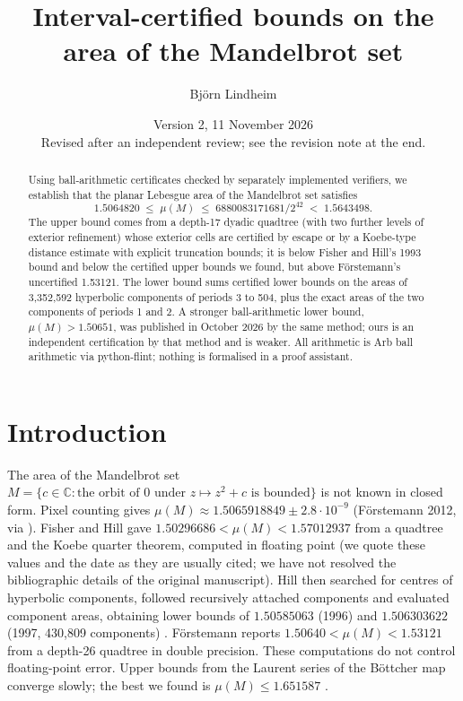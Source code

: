 \documentclass[11pt]{article}
\title{Interval-certified bounds on the area of the Mandelbrot set}
\author{Bj\"orn Lindheim}
\date{Version 2, 11 November 2026 \\[0.5ex] \small Revised after an independent review; see the revision note at the end.}
\begin{document}
\maketitle

\begin{abstract}
Using ball-arithmetic certificates checked by separately implemented verifiers, we establish that the planar Lebesgue area of the Mandelbrot set satisfies
\[
  1.5064820 \;\le\; \mu(M) \;\le\; 6880083171681/2^{42} \;<\; 1.5643498 .
\]
The upper bound comes from a depth-17 dyadic quadtree (with two further levels of exterior refinement) whose exterior cells are certified by escape or by a Koebe-type distance estimate with explicit truncation bounds; it is below Fisher and Hill's 1993 bound and below the certified upper bounds we found, but above F\"orstemann's uncertified 1.53121. The lower bound sums certified lower bounds on the areas of 3,352,592 hyperbolic components of periods 3 to 504, plus the exact areas of the two components of periods 1 and 2. A stronger ball-arithmetic lower bound, $\mu(M)>1.50651$, was published in October 2026 by the same method; ours is an independent certification by that method and is weaker. All arithmetic is Arb ball arithmetic via python-flint; nothing is formalised in a proof assistant.
\end{abstract}

\section{Introduction}

The area of the Mandelbrot set $M=\{c\in\mathbb{C}: \text{the orbit of }0\text{ under }z\mapsto z^2+c\text{ is bounded}\}$ is not known in closed form. Pixel counting gives $\mu(M)\approx1.5065918849\pm2.8\cdot10^{-9}$ (F\"orstemann 2012, via \cite{munafo}). Fisher and Hill \cite{fisherhill1993} gave $1.50296686<\mu(M)<1.57012937$ from a quadtree and the Koebe quarter theorem, computed in floating point (we quote these values and the date as they are usually cited; we have not resolved the bibliographic details of the original manuscript). Hill then searched for centres of hyperbolic components, followed recursively attached components and evaluated component areas, obtaining lower bounds of $1.50585063$ (1996) and $1.506303622$ (1997, 430,809 components) \cite{munafo,hill2003}. F\"orstemann \cite{forstemann2017} reports $1.50640<\mu(M)<1.53121$ from a depth-26 quadtree in double precision. These computations do not control floating-point error. Upper bounds from the Laurent series of the B\"ottcher map \cite{ewingschober1992,bittner2017,irving_mandelbrot} converge slowly; the best we found is $\mu(M)\le1.651587$ \cite{irving_mandelbrot}.
\end{document}
